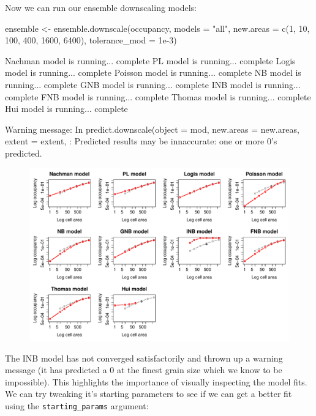 \documentclass{article}[12pt, a4paper]
\begin{document}
\newpage
Now we can run our ensemble downscaling models:

\begin{Schunk}
\begin{Sinput}
ensemble <- ensemble.downscale(occupancy,
                               models = "all",
                               new.areas = c(1, 10, 100, 400, 1600, 6400),
                               tolerance_mod = 1e-3)
\end{Sinput}
\begin{Soutput}
Nachman model is running...  complete 
PL model is running...  complete 
Logis model is running...  complete 
Poisson model is running...  complete 
NB model is running...  complete 
GNB model is running...  complete 
INB model is running...  complete 
FNB model is running...  complete 
Thomas model is running...  complete 
Hui model is running...  complete

Warning message:
In predict.downscale(object = mod, new.areas = new.areas, extent = extent,  :
  Predicted results may be innaccurate: one or more 0's predicted.
\end{Soutput}
\end{Schunk}

\begin{figure}[!ht]
\centering
\includegraphics[width=\linewidth]{Downscaling-downscale34}
\end{figure}

\newpage
The INB model has not converged satisfactorily and thrown up a warning message (it has predicted a 0 at the finest grain size which we know to be impossible). This highlights the importance of visually inspecting the model fits. We can try tweaking it’s starting parameters to see if we can get a better fit using the \texttt{starting\_params} argument:
\end{document}
